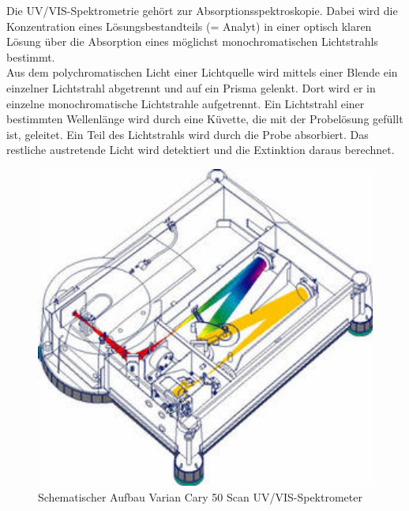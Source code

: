 Die UV/VIS-Spektrometrie gehört zur Absorptionsspektroskopie. Dabei wird die Konzentration
eines Lösungsbestandteils (= Analyt) in einer optisch klaren Lösung über die Absorption
eines möglichst monochromatischen Lichtstrahls bestimmt.\\
Aus dem polychromatischen Licht einer Lichtquelle wird mittels einer Blende ein einzelner
Lichtstrahl abgetrennt und auf ein Prisma gelenkt. Dort wird er in einzelne monochromatische
Lichtstrahle aufgetrennt. Ein Lichtstrahl einer bestimmten Wellenlänge wird
durch eine Küvette, die mit der Probelösung gefüllt ist, geleitet. Ein Teil des Lichtstrahls wird
durch die Probe absorbiert. Das restliche austretende Licht wird detektiert und die Extinktion
daraus berechnet.
\begin{figure}[htbp]
	\centering
		\includegraphics[width=1.00\textwidth]{../Bilder/AufbauSpektrometer.jpg}
	\caption{Schematischer Aufbau Varian Cary 50 Scan UV/VIS-Spektrometer \cite{UV-VIS}}
	\label{fig:AufbauSpektrometer}
\end{figure}

